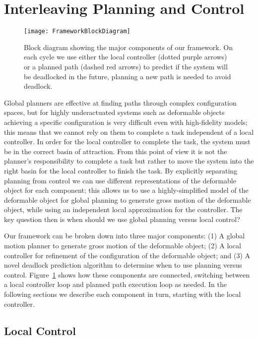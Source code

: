\section{Interleaving Planning and Control}
\label{sec:main_framework_loop}

\begin{figure}[t]
    \centering
    \texttt{[image: FrameworkBlockDiagram]}
    \caption{Block diagram showing the major components of our framework. On each cycle we use either the local controller (dotted purple arrows) or a planned path (dashed red arrows) to predict if the system will be deadlocked in the future, planning a new path is needed to avoid deadlock.}
    \label{fig:main_loop_diagram}
\end{figure}

Global planners are effective at finding paths through complex configuration spaces, but for highly underactuated systems such as deformable objects achieving a specific configuration is very difficult even with high-fidelity models; this means that we cannot rely on them to complete a task independent of a local controller. In order for the local controller to complete the task, the system must be in the correct basin of attraction. From this point of view it is not the planner's responsibility to complete a task but rather to move the system into the right basin for the local controller to finish the task. By explicitly separating planning from control we can use different representations of the deformable object for each component; this allows us to use a highly-simplified model of the deformable object for global planning to generate gross motion of the deformable object, while using an independent local approximation for the controller. The key question then is when should we use global planning versus local control?

Our framework can be broken down into three major components: (1) A global motion planner to generate gross motion of the deformable object; (2) A local controller for refinement of the configuration of the deformable object; and (3) A novel deadlock prediction algorithm to determine when to use planning versus control. Figure~\ref{fig:main_loop_diagram} shows how these components are connected, switching between a local controller loop and planned path execution loop as needed. In the following sections we describe each component in turn, starting with the local controller.


\subsection{Local Control}
\label{sec:local_control}

